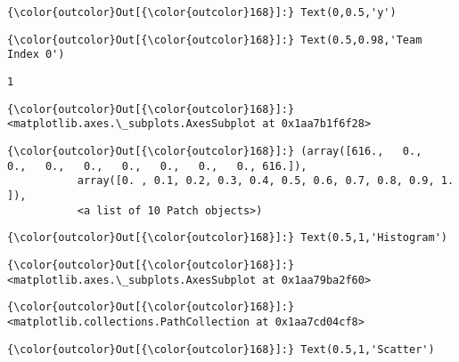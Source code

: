 \documentclass[11pt]{article}
\begin{document}
\begin{Verbatim}[commandchars=\\\{\}]
{\color{outcolor}Out[{\color{outcolor}168}]:} Text(0,0.5,'y')
\end{Verbatim}
            
\begin{Verbatim}[commandchars=\\\{\}]
{\color{outcolor}Out[{\color{outcolor}168}]:} Text(0.5,0.98,'Team Index 0')
\end{Verbatim}
            
    \begin{Verbatim}[commandchars=\\\{\}]
1

    \end{Verbatim}

\begin{Verbatim}[commandchars=\\\{\}]
{\color{outcolor}Out[{\color{outcolor}168}]:} <matplotlib.axes.\_subplots.AxesSubplot at 0x1aa7b1f6f28>
\end{Verbatim}
            
\begin{Verbatim}[commandchars=\\\{\}]
{\color{outcolor}Out[{\color{outcolor}168}]:} (array([616.,   0.,   0.,   0.,   0.,   0.,   0.,   0.,   0., 616.]),
           array([0. , 0.1, 0.2, 0.3, 0.4, 0.5, 0.6, 0.7, 0.8, 0.9, 1. ]),
           <a list of 10 Patch objects>)
\end{Verbatim}
            
\begin{Verbatim}[commandchars=\\\{\}]
{\color{outcolor}Out[{\color{outcolor}168}]:} Text(0.5,1,'Histogram')
\end{Verbatim}
            
\begin{Verbatim}[commandchars=\\\{\}]
{\color{outcolor}Out[{\color{outcolor}168}]:} <matplotlib.axes.\_subplots.AxesSubplot at 0x1aa79ba2f60>
\end{Verbatim}
            
\begin{Verbatim}[commandchars=\\\{\}]
{\color{outcolor}Out[{\color{outcolor}168}]:} <matplotlib.collections.PathCollection at 0x1aa7cd04cf8>
\end{Verbatim}
            
\begin{Verbatim}[commandchars=\\\{\}]
{\color{outcolor}Out[{\color{outcolor}168}]:} Text(0.5,1,'Scatter')
\end{Verbatim}
            
\end{document}
